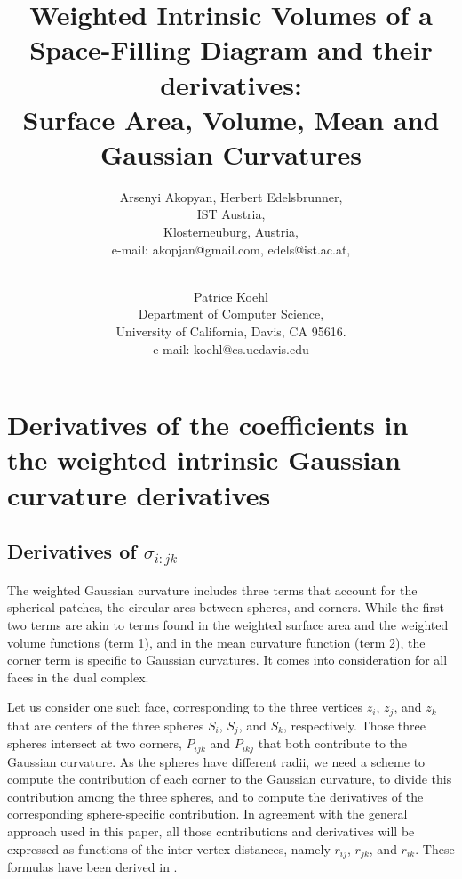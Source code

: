 \documentclass[11 pt]{article}
\title{Weighted Intrinsic Volumes of a Space-Filling Diagram and their derivatives: \\Surface Area, Volume, Mean and Gaussian Curvatures}
\author{Arsenyi Akopyan, Herbert Edelsbrunner,\\
            IST Austria, \\
            Klosterneuburg, Austria, \\
                 e-mail: akopjan@gmail.com, edels@ist.ac.at,\\ \\
        \and Patrice Koehl\\
            Department of Computer Science, \\
            University of California, Davis, CA 95616.\\
                 e-mail: koehl@cs.ucdavis.edu
        }
\theoremstyle{plain} \theorembodyfont{\rmfamily}
\begin{document}
\maketitle

\newpage





\section{Derivatives of the coefficients in the weighted intrinsic Gaussian curvature derivatives}
\label{sec:others}


   \subsection{Derivatives of $\sigma_{i:jk}$}
   
   The weighted Gaussian curvature includes three terms that account for the spherical patches, the circular arcs between spheres, and corners. While the first two terms are akin to terms found in the weighted surface area and the weighted volume functions (term 1), and in the mean curvature function (term 2), the corner term is specific to Gaussian curvatures. It comes into consideration for all faces in the dual complex. 
   
  Let us consider one such face,  corresponding to the three vertices $z_i$, $z_j$, and $z_k$ that are centers of the three spheres $S_i$, $S_j$, and $S_k$, respectively.
  Those three spheres intersect at two corners, $P_{ijk}$ and $P_{ikj}$ that both contribute to the Gaussian curvature. As the spheres have different radii, we need a scheme to compute the contribution of each corner to the Gaussian curvature, to divide this contribution among the three spheres, and to compute the derivatives of the corresponding sphere-specific contribution. In agreement with the general approach used in this paper, all those contributions and derivatives will be expressed as functions of the inter-vertex distances, namely $r_{ij}$, $r_{jk}$, and $r_{ik}$. These formulas have been derived in \cite{AkEd19b}. 
  
\end{document}
